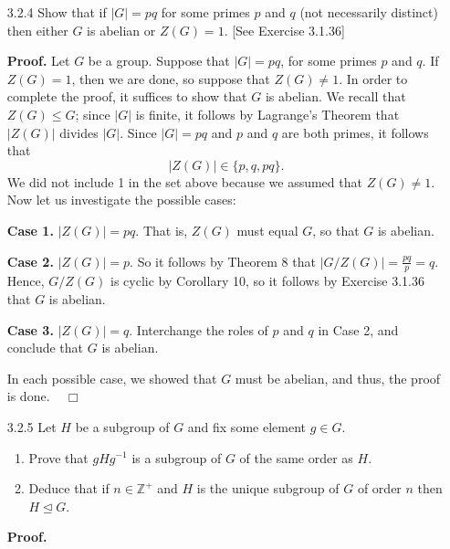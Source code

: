 \documentclass[9pt]{article}
\newcommand{\qed}{\hfill \ensuremath{\Box}}
\newcommand{\Z}{\mathbb{Z}}
\begin{document}
\begin{enumerate}
   \item[3.2.4]   Show that if $|G| = pq$ for some primes $p$ and $q$ (not
                  necessarily distinct) then either $G$ is abelian or
                  $Z(G) = 1$. [See Exercise 3.1.36]

      \textbf{Proof.} Let $G$ be a group. Suppose that $|G| = pq$, for some
      primes $p$ and $q$. If $Z(G) = 1$, then we are done, so suppose that
      $Z(G) \neq 1$. In order to complete the proof, it suffices to show that
      $G$ is abelian. We recall that $Z(G) \le G$; since $|G|$ is finite, it
      follows by Lagrange's Theorem that $|Z(G)|$ divides $|G|$. Since
      $|G| = pq$ and $p$ and $q$ are both primes, it follows that
      $$|Z(G)| \in \{p, q, pq\}.$$
      We did not include 1 in the set above because we assumed that
      $Z(G) \neq 1$. Now let us investigate the possible cases:

      \textbf{Case 1.} $|Z(G)| = pq$. That is, $Z(G)$ must equal $G$, so that
      $G$ is abelian.

      \textbf{Case 2.} $|Z(G)| = p$. So it follows by Theorem 8 that
      $|G/Z(G)| = \frac{pq}{p} = q$. Hence, $G/Z(G)$ is cyclic by Corollary 10, 
      so it follows by Exercise 3.1.36 that $G$ is abelian.

      \textbf{Case 3.} $|Z(G)| = q$. Interchange the roles of $p$ and $q$ in
      Case 2, and conclude that $G$ is abelian.

      In each possible case, we showed that $G$ must be abelian, and thus, the
      proof is done. \mbox{ } \qed
   \item[3.2.5]   Let $H$ be a subgroup of $G$ and fix some element $g \in G$.
                  \begin{enumerate}
                     \item Prove that $gHg^{-1}$ is a subgroup of $G$ of the
                           same order as $H$.
                     \item Deduce that if $n \in \Z^+$ and $H$ is the unique
                           subgroup of $G$ of order $n$ then
                           $H \trianglelefteq G$.
                  \end{enumerate}

      \textbf{Proof.}


\end{enumerate}
\end{document}

